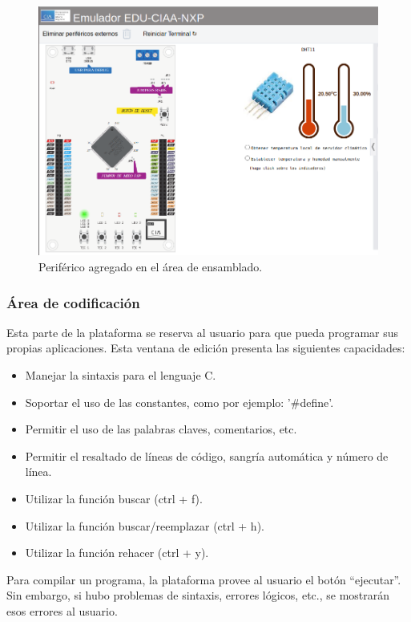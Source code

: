 \begin{figure}[ht]
	\centering
	\includegraphics[scale=.41]{./Figures/AgregarPeriferico2.png}
	\caption{Periférico agregado en el área de ensamblado. }
	\label{fig:AgregarPeriferico2}
\end{figure}


\subsubsection{Área de codificación}

Esta parte de la plataforma se reserva al usuario para que pueda programar sus propias aplicaciones. Esta ventana de edición presenta las siguientes capacidades:

\begin{itemize}
\item Manejar la sintaxis para el lenguaje C.
\item Soportar el uso de las constantes, como por ejemplo: '\#define'.
\item Permitir el uso de las palabras claves, comentarios, etc.
\item Permitir el resaltado de líneas de código, sangría automática y número de línea.
\item Utilizar la función buscar (ctrl + f).
\item Utilizar la función buscar/reemplazar (ctrl + h).
\item Utilizar la función rehacer (ctrl + y).
\end{itemize}


Para compilar un programa, la plataforma provee al usuario el botón “ejecutar”. Sin embargo, si hubo problemas de sintaxis, errores lógicos, etc., se mostrarán esos errores al usuario.

